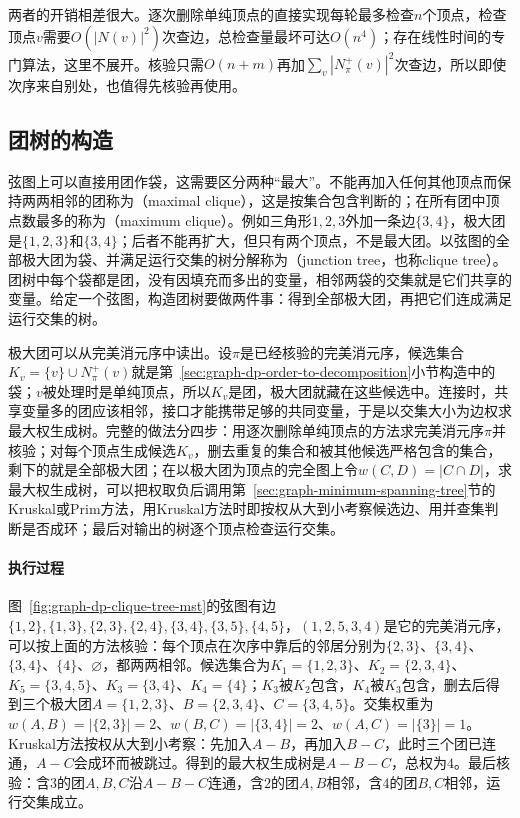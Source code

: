 两者的开销相差很大。逐次删除单纯顶点的直接实现每轮最多检查$n$个顶点，检查顶点$v$需要$O(|N(v)|^2)$次查边，总检查量最坏可达$O(n^4)$；存在线性时间的专门算法，这里不展开。核验只需$O(n+m)$再加$\sum_v|N^+_\pi(v)|^2$次查边，所以即使次序来自别处，也值得先核验再使用。

\subsection{团树的构造}
\label{sec:graph-dp-clique-tree}

弦图上可以直接用团作袋，这需要区分两种“最大”。不能再加入任何其他顶点而保持两两相邻的团称为（maximal clique），这是按集合包含判断的；在所有团中顶点数最多的称为（maximum clique）。例如三角形$1,2,3$外加一条边$\{3,4\}$，极大团是$\{1,2,3\}$和$\{3,4\}$；后者不能再扩大，但只有两个顶点，不是最大团。以弦图的全部极大团为袋、并满足运行交集的树分解称为（junction tree，也称clique tree）。团树中每个袋都是团，没有因填充而多出的变量，相邻两袋的交集就是它们共享的变量。给定一个弦图，构造团树要做两件事：得到全部极大团，再把它们连成满足运行交集的树。

极大团可以从完美消元序中读出。设$\pi$是已经核验的完美消元序，候选集合$K_v=\{v\}\cup N^+_\pi(v)$就是第~\ref{sec:graph-dp-order-to-decomposition}小节构造中的袋；$v$被处理时是单纯顶点，所以$K_v$是团，极大团就藏在这些候选中。连接时，共享变量多的团应该相邻，接口才能携带足够的共同变量，于是以交集大小为边权求最大权生成树。完整的做法分四步：用逐次删除单纯顶点的方法求完美消元序$\pi$并核验；对每个顶点生成候选$K_v$，删去重复的集合和被其他候选严格包含的集合，剩下的就是全部极大团；在以极大团为顶点的完全图上令$w(C,D)=|C\cap D|$，求最大权生成树，可以把权取负后调用第~\ref{sec:graph-minimum-spanning-tree}节的Kruskal或Prim方法，用Kruskal方法时即按权从大到小考察候选边、用并查集判断是否成环；最后对输出的树逐个顶点检查运行交集。

\paragraph{执行过程}
图~\ref{fig:graph-dp-clique-tree-mst}的弦图有边$\{1,2\},\allowbreak\{1,3\},\allowbreak\{2,3\},\allowbreak\{2,4\},\allowbreak\{3,4\},\allowbreak\{3,5\},\allowbreak\{4,5\}$，$(1,2,5,3,4)$是它的完美消元序，可以按上面的方法核验：每个顶点在次序中靠后的邻居分别为$\{2,3\}$、$\{3,4\}$、$\{3,4\}$、$\{4\}$、$\varnothing$，都两两相邻。候选集合为$K_1=\{1,2,3\}$、$K_2=\{2,3,4\}$、$K_5=\{3,4,5\}$、$K_3=\{3,4\}$、$K_4=\{4\}$；$K_3$被$K_2$包含，$K_4$被$K_3$包含，删去后得到三个极大团$A=\{1,2,3\}$、$B=\{2,3,4\}$、$C=\{3,4,5\}$。交集权重为$w(A,B)=|\{2,3\}|=2$、$w(B,C)=|\{3,4\}|=2$、$w(A,C)=|\{3\}|=1$。Kruskal方法按权从大到小考察：先加入$A-B$，再加入$B-C$，此时三个团已连通，$A-C$会成环而被跳过。得到的最大权生成树是$A-B-C$，总权为$4$。最后核验：含$3$的团$A,B,C$沿$A-B-C$连通，含$2$的团$A,B$相邻，含$4$的团$B,C$相邻，运行交集成立。


